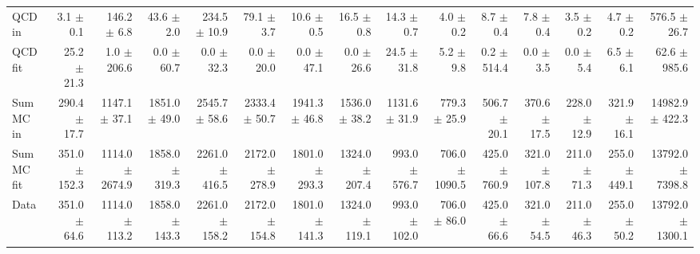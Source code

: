 \begin{table}[htbp]
{\begin{tabular}{lrrrrrrrrrrrrrr}
\hline
QCD in & 3.1 $\pm$ 0.1 & 146.2 $\pm$ 6.8 & 43.6 $\pm$ 2.0 & 234.5 $\pm$ 10.9 & 79.1 $\pm$ 3.7 & 10.6 $\pm$ 0.5 & 16.5 $\pm$ 0.8 & 14.3 $\pm$ 0.7 & 4.0 $\pm$ 0.2 & 8.7 $\pm$ 0.4 & 7.8 $\pm$ 0.4 & 3.5 $\pm$ 0.2 & 4.7 $\pm$ 0.2 & 576.5 $\pm$ 26.7 \\
QCD fit & 25.2 $\pm$ 21.3 & 1.0 $\pm$ 206.6 & 0.0 $\pm$ 60.7 & 0.0 $\pm$ 32.3 & 0.0 $\pm$ 20.0 & 0.0 $\pm$ 47.1 & 0.0 $\pm$ 26.6 & 24.5 $\pm$ 31.8 & 5.2 $\pm$ 9.8 & 0.2 $\pm$ 514.4 & 0.0 $\pm$ 3.5 & 0.0 $\pm$ 5.4 & 6.5 $\pm$ 6.1 & 62.6 $\pm$ 985.6 \\
\hline
Sum MC in & 290.4 $\pm$ 17.7 & 1147.1 $\pm$ 37.1 & 1851.0 $\pm$ 49.0 & 2545.7 $\pm$ 58.6 & 2333.4 $\pm$ 50.7 & 1941.3 $\pm$ 46.8 & 1536.0 $\pm$ 38.2 & 1131.6 $\pm$ 31.9 & 779.3 $\pm$ 25.9 & 506.7 $\pm$ 20.1 & 370.6 $\pm$ 17.5 & 228.0 $\pm$ 12.9 & 321.9 $\pm$ 16.1& 14982.9 $\pm$ 422.3 \\
Sum MC fit & 351.0 $\pm$ 152.3 & 1114.0 $\pm$ 2674.9 & 1858.0 $\pm$ 319.3 & 2261.0 $\pm$ 416.5 & 2172.0 $\pm$ 278.9 & 1801.0 $\pm$ 293.3 & 1324.0 $\pm$ 207.4 & 993.0 $\pm$ 576.7 & 706.0 $\pm$ 1090.5 & 425.0 $\pm$ 760.9 & 321.0 $\pm$ 107.8 & 211.0 $\pm$ 71.3 & 255.0 $\pm$ 449.1 & 13792.0 $\pm$ 7398.8 \\
\hline
Data & 351.0 $\pm$ 64.6 & 1114.0 $\pm$ 113.2 & 1858.0 $\pm$ 143.3 & 2261.0 $\pm$ 158.2 & 2172.0 $\pm$ 154.8 & 1801.0 $\pm$ 141.3 & 1324.0 $\pm$ 119.1 & 993.0 $\pm$ 102.0 & 706.0 $\pm$ 86.0 & 425.0 $\pm$ 66.6 & 321.0 $\pm$ 54.5 & 211.0 $\pm$ 46.3 & 255.0 $\pm$ 50.2 & 13792.0 $\pm$ 1300.1 \\
\hline
\end{tabular}
}
\end{table}
